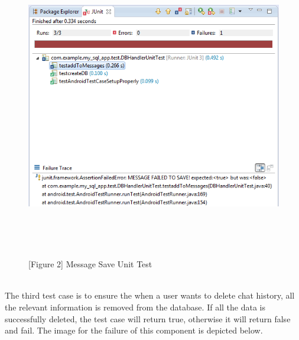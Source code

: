 \documentclass[29pt,a4paper]{moderncv}
\begin{document}
	\begin{figure}
				\centering
				\\ \includegraphics[width=6.0in, height=5.0in]{./messagesave.png}
				\\\caption{[Figure 2] Message Save Unit Test}
	\end{figure}\\
	
	The third test case is to ensure the when a user wants to delete chat history, all the relevant information is removed from the database. If all the data is successfully deleted, the test case will return true, otherwise it will return false and fail. The image for the failure of this component is depicted below.\\
	
\end{document}
